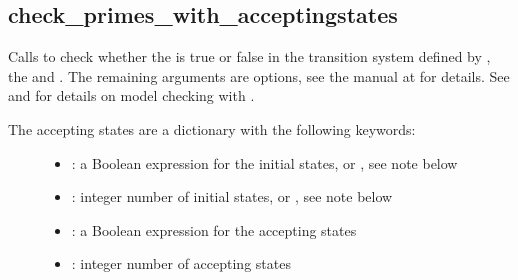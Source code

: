 \documentclass[letterpaper,10pt,english]{sphinxmanual}
\begin{document}
\subsection{check\_primes\_with\_acceptingstates}
\label{\detokenize{ModelChecking:id4}}\label{\detokenize{ModelChecking:check-primes-with-acceptingstates}}

\begin{fulllineitems}
\label{\detokenize{ModelChecking:PyBoolNet.ModelChecking.check_primes_with_acceptingstates}}
Calls {\hyperref[\detokenize{Installation:installation-nusmv}]{}} to check whether the  is true or false in the transition system defined by ,
the  and .
The remaining arguments are {\hyperref[\detokenize{Installation:installation-nusmv}]{}} options, see the manual at  for details.
See {\hyperref[\detokenize{ModelChecking:primes2smv}]{}} and {\hyperref[\detokenize{Manual:sec-model-checking}]{}} for details on model checking with .
\begin{description}
\item[{The accepting states are a dictionary with the following keywords:}] \leavevmode\begin{itemize}
\item {} 
: a Boolean expression for the initial states, or , see note below

\item {} 
: integer number of initial states, or , see note below

\item {} 
: a Boolean expression for the accepting states

\item {} 
: integer number of accepting states


\end{itemize}
\end{description}
\end{fulllineitems}
\end{document}
